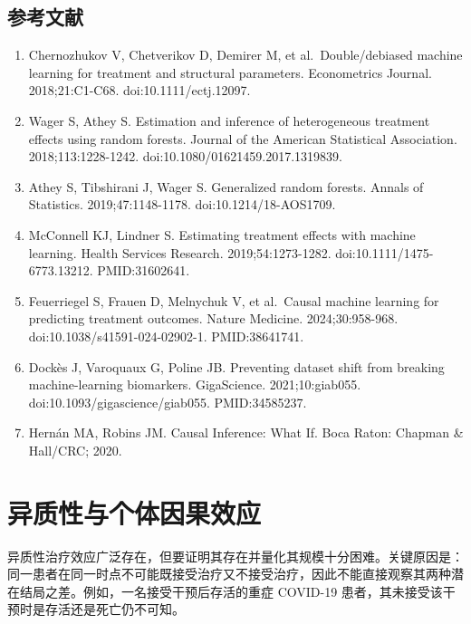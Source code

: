 \documentclass[
  chinese-hans,
  letterpaper,
  DIV=11,
  numbers=noendperiod]{scrreprt}
\begin{document}
\section*{参考文献}\label{ux53c2ux8003ux6587ux732e-12}


\begin{enumerate}
\def\labelenumi{\arabic{enumi}.}
\item
  Chernozhukov V, Chetverikov D, Demirer M, et al.~Double/debiased
  machine learning for treatment and structural parameters. Econometrics
  Journal. 2018;21:C1-C68. doi:10.1111/ectj.12097.
\item
  Wager S, Athey S. Estimation and inference of heterogeneous treatment
  effects using random forests. Journal of the American Statistical
  Association. 2018;113:1228-1242. doi:10.1080/01621459.2017.1319839.
\item
  Athey S, Tibshirani J, Wager S. Generalized random forests. Annals of
  Statistics. 2019;47:1148-1178. doi:10.1214/18-AOS1709.
\item
  McConnell KJ, Lindner S. Estimating treatment effects with machine
  learning. Health Services Research. 2019;54:1273-1282.
  doi:10.1111/1475-6773.13212. PMID:31602641.
\item
  Feuerriegel S, Frauen D, Melnychuk V, et al.~Causal machine learning
  for predicting treatment outcomes. Nature Medicine. 2024;30:958-968.
  doi:10.1038/s41591-024-02902-1. PMID:38641741.
\item
  Dockès J, Varoquaux G, Poline JB. Preventing dataset shift from
  breaking machine-learning biomarkers. GigaScience. 2021;10:giab055.
  doi:10.1093/gigascience/giab055. PMID:34585237.
\item
  Hernán MA, Robins JM. Causal Inference: What If. Boca Raton: Chapman
  \& Hall/CRC; 2020.
\end{enumerate}


\chapter{异质性与个体因果效应}\label{ux5f02ux8d28ux6027ux4e0eux4e2aux4f53ux56e0ux679cux6548ux5e94}

异质性治疗效应广泛存在，但要证明其存在并量化其规模十分困难。关键原因是：同一患者在同一时点不可能既接受治疗又不接受治疗，因此不能直接观察其两种潜在结局之差。例如，一名接受干预后存活的重症
COVID-19 患者，其未接受该干预时是存活还是死亡仍不可知。
\end{document}
